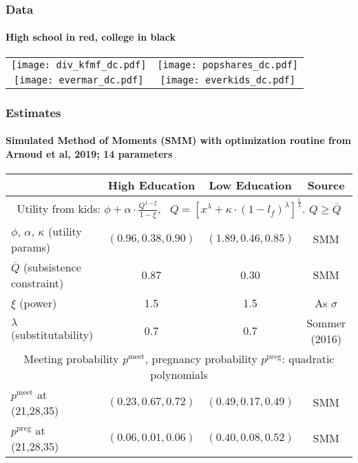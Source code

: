\documentclass[aspectratio=169]{beamer}
\begin{document}
\begin{frame}
\frametitle{Data}
\framesubtitle{High school in red, college in black}
\begin{center}
\begin{tabular}{c c}
\hspace{-0.5cm} \texttt{[image: div\_kfmf\_dc.pdf]} & \texttt{[image: popshares\_dc.pdf]} \\
\hspace{-0.5cm} \texttt{[image: evermar\_dc.pdf]} & \texttt{[image: everkids\_dc.pdf]} \\
\end{tabular}
\end{center}
\end{frame}


\begin{frame}
\frametitle{Estimates}
\framesubtitle{Simulated Method of Moments (SMM) with optimization routine from Arnoud et al, 2019; 14 parameters}
\begin{tabular}{l c c c}\hline
& High Education & Low Education & Source \\\hline
\multicolumn{4}{c}{Utility from kids: $\phi + \alpha \cdot \frac{Q^{1-\xi}}{1-\xi}$, \ $Q = [x^{\lambda} + \kappa\cdot(1-l_f)^{\lambda}]^{\frac1{\lambda}}$. $Q\geq \bar{Q}$}\\\hline
$\phi$, $\alpha$, $\kappa$  \footnotesize (utility params) &\footnotesize  $(0.96, 0.38, 0.90)$ &\footnotesize $(1.89,0.46, 0.85)$ & SMM \\
$\bar{Q}$ \footnotesize (subsistence constraint) & 0.87 & 0.30 & SMM\\
$\xi$ \footnotesize (power)  & 1.5 & 1.5 & As $\sigma$ \\
$\lambda$ \footnotesize (substitutability)  & 0.7 & 0.7 & \footnotesize Sommer (2016) \\\hline\hline %
\multicolumn{4}{c}{Meeting probability $p^{\text{meet}}$, pregnancy probability $p^{\text{preg}}$: quadratic polynomials}\\\hline
$p^{\text{meet}}$  \footnotesize at (21,28,35) & \footnotesize $(0.23, 0.67, 0.72)$ & \footnotesize  $(0.49, 0.17, 0.49)$& SMM\\
$p^{\text{preg}}$ \footnotesize  at (21,28,35) & \footnotesize  $(0.06, 0.01, 0.06)$ & \footnotesize  $(0.40, 0.08, 0.52)$ & SMM \\\hline\hline

\end{tabular}
\end{frame}
\end{document}
